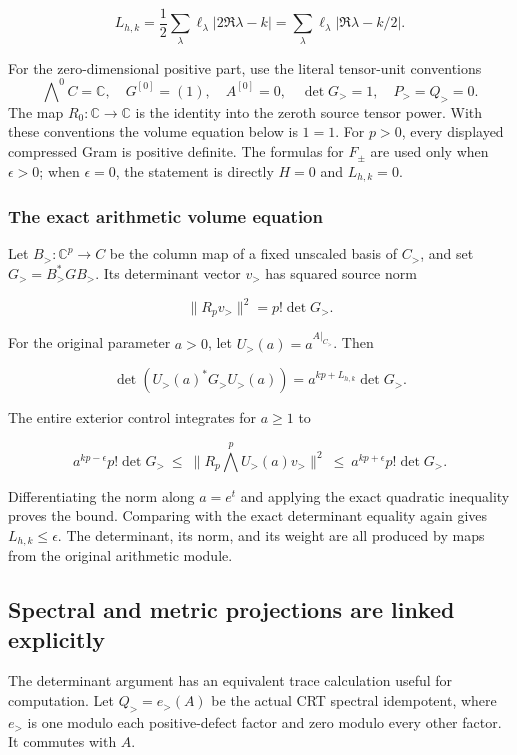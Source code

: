 \[
L_{h,k}
=\frac12\sum_\lambda\ell_\lambda|2\Re\lambda-k|
=\sum_\lambda\ell_\lambda|\Re\lambda-k/2|.
\]

For the zero-dimensional positive part, use the literal tensor-unit
conventions
\[
\bigwedge\nolimits^0 C=\mathbb C,\quad G^{[0]}=(1),\quad
A^{[0]}=0,\quad \det G_{>}=1,\quad P_{>}=Q_{>}=0 .
\]
The map \(R_0:\mathbb C\to\mathbb C\) is the identity into the zeroth
source tensor power. With these conventions the volume equation below
is \(1=1\). For \(p>0\), every displayed compressed Gram is positive
definite. The formulas for \(F_\pm\) are used only when \(\epsilon>0\);
when \(\epsilon=0\), the statement is directly \(H=0\) and \(L_{h,k}=0\).


\subsubsection{The exact arithmetic volume
equation}\label{exttrace-the-exact-arithmetic-volume-equation}

Let \(B_{>}:\mathbb C^p\to C\) be the column map of a fixed unscaled
basis of \(C_{>}\), and set \(G_{>}=B_{>}^*GB_{>}\). Its determinant
vector \(v_{>}\) has squared source norm

\[
\|R_pv_{>}\|^2=p!\det G_{>}.
\]

For the original parameter \(a>0\), let \(U_{>}(a)=a^{A|_{C_{>}}}\).
Then

\[
\boxed{
\det(U_{>}(a)^*G_{>}U_{>}(a))
=a^{kp+L_{h,k}}\det G_{>}.
}
\]

The entire exterior control integrates for \(a\geq1\) to

\[
a^{kp-\epsilon}p!\det G_{>}
\ \leq\ \|R_p\bigwedge^pU_{>}(a)v_{>}\|^2
\ \leq\ a^{kp+\epsilon}p!\det G_{>}.
\]

Differentiating the norm along \(a=e^t\) and applying the exact
quadratic inequality proves the bound. Comparing with the exact
determinant equality again gives \(L_{h,k}\leq\epsilon\). The
determinant, its norm, and its weight are all produced by maps from the
original arithmetic module.

\subsection{Spectral and metric projections are linked
explicitly}\label{exttrace-spectral-and-metric-projections-are-linked-explicitly}

The determinant argument has an equivalent trace calculation useful for
computation. Let \(Q_{>}=e_{>}(A)\) be the actual CRT spectral
idempotent, where \(e_{>}\) is one modulo each positive-defect factor
and zero modulo every other factor. It commutes with \(A\).

